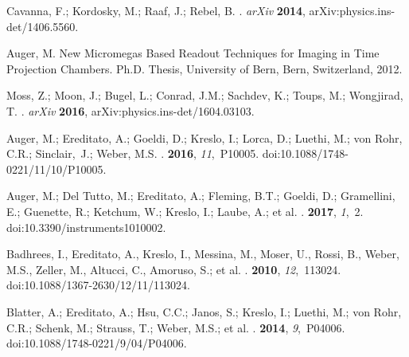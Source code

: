 \documentclass[instruments,article,accept,moreauthors,pdftex]{Definitions/mdpi}
\begin{document}
\begin{thebibliography}{999}
Cavanna, F.; Kordosky, M.; Raaf, J.; Rebel, B.
. \emph{arXiv} {\bf 2014}, arXiv:physics.ins-det/1406.5560.

Auger, M.
\newblock New Micromegas Based Readout Techniques for Imaging in Time
  Projection Chambers.
\newblock Ph.D. Thesis, University of Bern, Bern,  Switzerland,  2012.

Moss, Z.; Moon, J.; Bugel, L.; Conrad, J.M.; Sachdev, K.; Toups, M.; Wongjirad,
  T.
. \emph{arXiv} {\bf 2016}, arXiv:physics.ins-det/1604.03103.

Auger, M.; Ereditato, A.; Goeldi, D.; Kreslo, I.; Lorca, D.; Luethi, M.; von Rohr, C.R.; Sinclair,~J.; Weber, M.S.
.
 {\bf 2016}, {\em 11},~P10005.
\newblock
  doi:10.1088/1748-0221/11/10/P10005.

Auger, M.; Del Tutto, M.; Ereditato, A.; Fleming, B.T.; Goeldi, D.; Gramellini, E.; Guenette, R.; Ketchum, W.; Kreslo, I.; Laube, A.; et al.
.
 {\bf 2017}, {\em 1},~2.
\newblock
  doi:10.3390/instruments1010002.

Badhrees, I., Ereditato, A., Kreslo, I., Messina, M., Moser, U., Rossi, B., Weber, M.S., Zeller, M., Altucci, C., Amoruso, S.; et al.
.
 {\bf 2010}, {\em 12},~113024.
\newblock
  doi:10.1088/1367-2630/12/11/113024.

Blatter, A.; Ereditato, A.; Hsu, C.C.; Janos, S.; Kreslo, I.; Luethi, M.; von Rohr, C.R.; Schenk, M.; Strauss, T.; Weber, M.S.; et al.
.
 {\bf 2014}, {\em 9},~P04006.
\newblock
  doi:10.1088/1748-0221/9/04/P04006.


\end{thebibliography}
\end{document}
